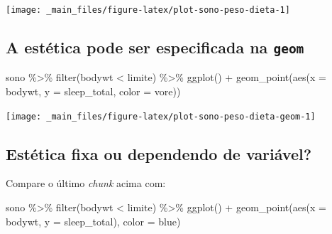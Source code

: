 \documentclass[
  11pt]{report}
\newenvironment{Shaded}{\begin{snugshade}}{\end{snugshade}}
\newcommand{\AttributeTok}[1]{\textcolor[rgb]{0.77,0.63,0.00}{#1}}
\newcommand{\FunctionTok}[1]{\textcolor[rgb]{0.00,0.00,0.00}{#1}}
\newcommand{\NormalTok}[1]{#1}
\newcommand{\SpecialCharTok}[1]{\textcolor[rgb]{0.00,0.00,0.00}{#1}}
\newcommand{\StringTok}[1]{\textcolor[rgb]{0.31,0.60,0.02}{#1}}
\begin{document}
\begin{center}\texttt{[image: \_main\_files/figure-latex/plot-sono-peso-dieta-1]} \end{center}

\hypertarget{a-estuxe9tica-pode-ser-especificada-na-geom}{%
\subsection{\texorpdfstring{A estética pode ser especificada na \texttt{geom}}{A estética pode ser especificada na geom}}\label{a-estuxe9tica-pode-ser-especificada-na-geom}}

\begin{Shaded}
\begin{Highlighting}[]
\NormalTok{sono }\SpecialCharTok{\%\textgreater{}\%} 
  \FunctionTok{filter}\NormalTok{(bodywt }\SpecialCharTok{\textless{}}\NormalTok{ limite) }\SpecialCharTok{\%\textgreater{}\%} 
  \FunctionTok{ggplot}\NormalTok{() }\SpecialCharTok{+}
    \FunctionTok{geom\_point}\NormalTok{(}\FunctionTok{aes}\NormalTok{(}\AttributeTok{x =}\NormalTok{ bodywt, }\AttributeTok{y =}\NormalTok{ sleep\_total, }\AttributeTok{color =}\NormalTok{ vore))}
\end{Highlighting}
\end{Shaded}

\begin{center}\texttt{[image: \_main\_files/figure-latex/plot-sono-peso-dieta-geom-1]} \end{center}

\hypertarget{estuxe9tica-fixa-ou-dependendo-de-variuxe1vel}{%
\subsection{Estética fixa ou dependendo de variável?}\label{estuxe9tica-fixa-ou-dependendo-de-variuxe1vel}}

Compare o último \emph{chunk} acima com:

\begin{Shaded}
\begin{Highlighting}[]
\NormalTok{sono }\SpecialCharTok{\%\textgreater{}\%} 
  \FunctionTok{filter}\NormalTok{(bodywt }\SpecialCharTok{\textless{}}\NormalTok{ limite) }\SpecialCharTok{\%\textgreater{}\%} 
  \FunctionTok{ggplot}\NormalTok{() }\SpecialCharTok{+}
    \FunctionTok{geom\_point}\NormalTok{(}\FunctionTok{aes}\NormalTok{(}\AttributeTok{x =}\NormalTok{ bodywt, }\AttributeTok{y =}\NormalTok{ sleep\_total), }\AttributeTok{color =} \StringTok{\textquotesingle{}blue\textquotesingle{}}\NormalTok{)}
\end{Highlighting}
\end{Shaded}
\end{document}
